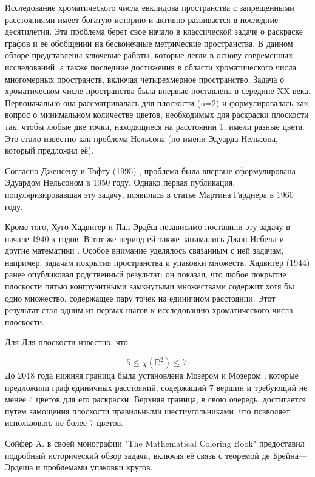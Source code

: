 \documentclass[12pt]{article}
\begin{document}
Исследование хроматического числа евклидова пространства с запрещенными расстояниями имеет богатую историю и активно развивается в последние десятилетия. Эта проблема берет свое начало в классической задаче о раскраске графов и её обобщении на бесконечные метрические пространства. В данном обзоре представлены ключевые работы, которые легли в основу современных исследований, а также последние достижения в области хроматического числа многомерных пространств, включая четырехмерное пространство. 
Задача о хроматическом числе пространства была впервые поставлена в середине XX века. Первоначально она рассматривалась для плоскости (n=2) и формулировалась как вопрос о минимальном количестве цветов, необходимых для раскраски плоскости так, чтобы любые две точки, находящиеся на расстоянии 1, имели разные цвета. Это стало известно как проблема Нельсона (по имени Эдуарда Нельсона, который предложил её).

Согласно Дженсену и Тофту (1995) \cite{Jasen1995}, проблема была впервые сформулирована Эдуардом Нельсоном в 1950 году. Однако первая публикация, популяризировавшая эту задачу, появилась в статье Мартина Гарднера в 1960 году.

Кроме того, Хуго Хадвигер и Пал Эрдёш независимо поставили эту задачу в начале 1940-х годов. В тот же период ей также занимались Джон Исбелл и другие математики \cite{Raygorodsky2003}. Особое внимание уделялось связанным с ней задачам, например, задачам покрытия пространства и упаковки множеств. Хадвигер (1944) \cite{Hadwiger1944} ранее опубликовал родственный результат: он показал, что любое покрытие плоскости пятью конгруэнтными замкнутыми множествами содержит хотя бы одно множество, содержащее пару точек на единичном расстоянии. Этот результат стал одним из первых шагов к исследованию хроматического числа плоскости.

Для 
Для плоскости известно, что

\[ 5 \leq \chi(\mathbb{R}^{2}) \leq 7. \]
До 2018 года нижняя граница была установлена Мозером и Мозером \cite{Soifer2004, Soifer1991}, которые предложили граф единичных расстояний, содержащий 7 вершин и требующий не менее 4 цветов для его раскраски. Верхняя граница, в свою очередь, достигается путем замощения плоскости правильными шестиугольниками, что позволяет использовать не более 7 цветов. 

Сойфер A. \cite{Soifer2008} в своей монографии "The Mathematical Coloring Book" предоставил подробный исторический обзор задачи, включая её связь с теоремой де Брейна—Эрдеша и проблемами упаковки кругов.
    
\end{document}
